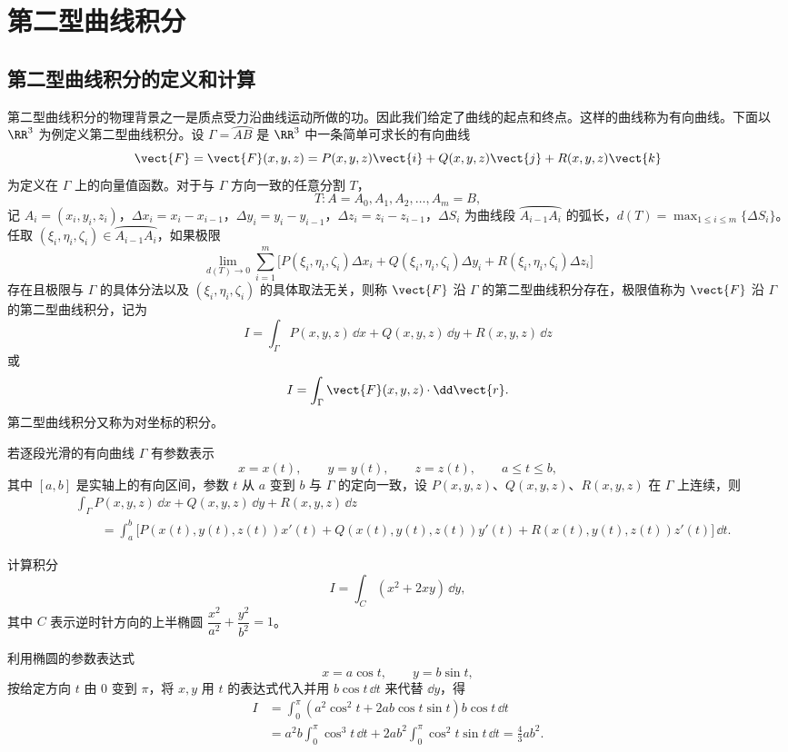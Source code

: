 \section{第二型曲线积分}

\subsection{第二型曲线积分的定义和计算}

第二型曲线积分的物理背景之一是质点受力沿曲线运动所做的功。因此我们给定了曲线的起点和终点。这样的曲线称为有向曲线。下面以 $\RR^3$ 为例定义第二型曲线积分。设 $\Gamma=\wideparen{AB}$ 是 $\RR^3$ 中一条简单可求长的有向曲线
\[
  \vect{F}=\vect{F}(x,y,z)=P(x,y,z)\vect{i}+Q(x,y,z)\vect{j}+R(x,y,z)\vect{k}
\]
为定义在 $\Gamma$ 上的向量值函数。对于与 $\Gamma$ 方向一致的任意分割 $T$，
\[
  T\colon A=A_0,A_1,A_2,\ldots,A_m=B,
\]
记 $A_i=(x_i,y_i,z_i)$，$\Delta x_i=x_i-x_{i-1}$，$\Delta y_i=y_i-y_{i-1}$，$\Delta z_i=z_i-z_{i-1}$，$\Delta S_i$ 为曲线段 $\wideparen{A_{i-1}A_i}$ 的弧长，$d(T)=\max_{1\le i\le m}\{\Delta S_i\}$。任取 $(\xi_i,\eta_i,\zeta_i)\in\wideparen{A_{i-1}A_i}$，如果极限
\[
  \lim_{d(T)\to0}\sum_{i=1}^m\bigl[P(\xi_i,\eta_i,\zeta_i)\Delta x_i+Q(\xi_i,\eta_i,\zeta_i)\Delta y_i+R(\xi_i,\eta_i,\zeta_i)\Delta z_i\bigr]
\]
存在且极限与 $\Gamma$ 的具体分法以及 $(\xi_i,\eta_i,\zeta_i)$ 的具体取法无关，则称 $\vect{F}$ 沿 $\Gamma$ 的第二型曲线积分存在，极限值称为 $\vect{F}$ 沿 $\Gamma$ 的第二型曲线积分，记为
\[
  I=\int_\Gamma P(x,y,z)\,\dd x+Q(x,y,z)\,\dd y+R(x,y,z)\,\dd z
\]
或
\[
  I=\int_\Gamma \vect{F}(x,y,z)\cdot\dd\vect{r}.
\]
第二型曲线积分又称为对坐标的积分。

若逐段光滑的有向曲线 $\Gamma$ 有参数表示
\[
  x=x(t),\qquad y=y(t),\qquad z=z(t),\qquad a\le t\le b,
\]
其中 $[a,b]$ 是实轴上的有向区间，参数 $t$ 从 $a$ 变到 $b$ 与 $\Gamma$ 的定向一致，设 $P(x,y,z)$、$Q(x,y,z)$、$R(x,y,z)$ 在 $\Gamma$ 上连续，则
\begin{align*}
  &\int_\Gamma P(x,y,z)\,\dd x+Q(x,y,z)\,\dd y+R(x,y,z)\,\dd z\\
  &\qquad=\int_a^b\bigl[P(x(t),y(t),z(t))x'(t)+Q(x(t),y(t),z(t))y'(t)+R(x(t),y(t),z(t))z'(t)\bigr]\,\dd t.
\end{align*}

\begin{xexample}[24.2.1]
计算积分
\[
  I=\int_C(x^2+2xy)\,\dd y,
\]
其中 $C$ 表示逆时针方向的上半椭圆 $\dfrac{x^2}{a^2}+\dfrac{y^2}{b^2}=1$。
\end{xexample}
\begin{xsolution}
利用椭圆的参数表达式
\[
  x=a\cos t,\qquad y=b\sin t,
\]
按给定方向 $t$ 由 $0$ 变到 $\pi$，将 $x,y$ 用 $t$ 的表达式代入并用 $b\cos t\,\dd t$ 来代替 $\dd y$，得
\begin{align*}
  I&=\int_0^\pi(a^2\cos^2t+2ab\cos t\sin t)b\cos t\,\dd t\\
   &=a^2b\int_0^\pi\cos^3t\,\dd t+2ab^2\int_0^\pi\cos^2t\sin t\,\dd t=\frac43ab^2.
\end{align*}
\end{xsolution}


